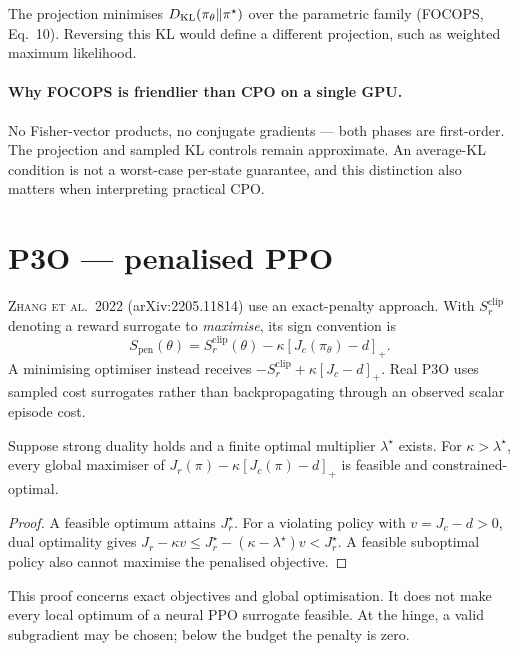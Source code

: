 \documentclass[11pt,oneside]{scrbook}
\begin{document}
The projection minimises $D_{\mathrm{KL}}(\pi_\theta\Vert\pi^\star)$ over the
parametric family (FOCOPS, Eq.~10). Reversing this KL would define a
different projection, such as weighted maximum likelihood.

\paragraph{Why FOCOPS is friendlier than CPO on a single GPU.}
No Fisher-vector products, no conjugate gradients --- both phases are
first-order. The projection and sampled KL controls remain approximate. An average-KL condition is not a worst-case per-state guarantee, and this distinction also matters when interpreting practical CPO.

\section{P3O --- penalised PPO}

\textsc{Zhang et al.\ 2022} (arXiv:2205.11814) use an exact-penalty
approach. With $S_r^{\mathrm{clip}}$ denoting a reward surrogate to
\emph{maximise}, its sign convention is
\begin{equation}\label{eq:p3o}
 S_{\mathrm{pen}}(\theta)=S_r^{\mathrm{clip}}(\theta)
       -\kappa[J_c(\pi_\theta)-d]_+.
\end{equation}
A minimising optimiser instead receives $-S_r^{\mathrm{clip}}+
\kappa[J_c-d]_+$. Real P3O uses sampled cost surrogates rather than
backpropagating through an observed scalar episode cost.

\begin{theorem}
Suppose strong duality holds and a finite optimal multiplier
$\lambda^\star$ exists. For $\kappa>\lambda^\star$, every global maximiser
of $J_r(\pi)-\kappa[J_c(\pi)-d]_+$ is feasible and constrained-optimal.
\end{theorem}
\begin{proof}
A feasible optimum attains $J_r^\star$. For a violating policy with
$v=J_c-d>0$, dual optimality gives
$J_r-\kappa v\leq J_r^\star-(\kappa-\lambda^\star)v<J_r^\star$.
A feasible suboptimal policy also cannot maximise the penalised objective.
\end{proof}
This proof concerns exact objectives and global optimisation. It does not
make every local optimum of a neural PPO surrogate feasible. At the hinge,
a valid subgradient may be chosen; below the budget the penalty is zero.
\end{document}
